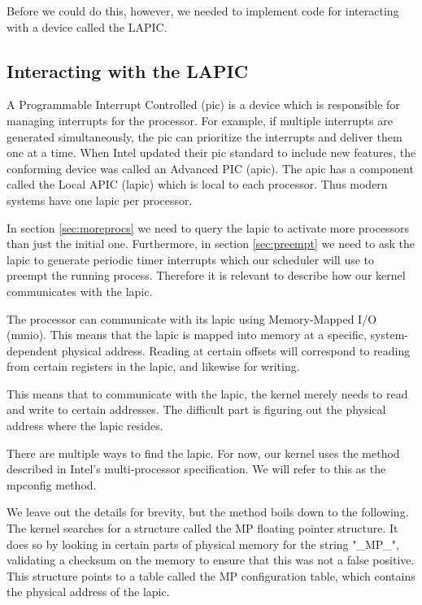 \documentclass{article}
\begin{document}
Before we could do this, however, we needed to implement code for interacting
with a device called the LAPIC.


\subsection{Interacting with the LAPIC}
\label{sec:mpconfig}
A Programmable Interrupt Controlled (\gls{pic}) is a device which is
responsible for managing interrupts for the processor. For example, if
multiple interrupts are generated simultaneously, the \gls{pic} can prioritize
the interrupts and deliver them one at a time. When Intel updated their
\gls{pic} standard to include new features, the conforming device was called
an Advanced PIC (\gls{apic}). The \gls{apic} has a component called the Local
APIC (\gls{lapic}) which is local to each processor. Thus modern systems have
one \gls{lapic} per processor.

In section \ref{sec:moreprocs} we need to query the \gls{lapic} to activate
more processors than just the initial one. Furthermore, in section
\ref{sec:preempt} we need to ask the \gls{lapic} to generate periodic timer
interrupts which our scheduler will use to preempt the running process.
Therefore it is relevant to describe how our kernel communicates with the
\gls{lapic}.

The processor can communicate with its \gls{lapic} using Memory-Mapped I/O
(\gls{mmio}). This means that the \gls{lapic} is mapped into memory at a
specific, system-dependent physical address. Reading at certain offsets will
correspond to reading from certain registers in the \gls{lapic}, and likewise
for writing.

This means that to communicate with the \gls{lapic}, the kernel merely needs
to read and write to certain addresses. The difficult part is figuring out the
physical address where the \gls{lapic} resides.

There are multiple ways to find the \gls{lapic}. For now, our kernel uses the
method described in Intel's multi-processor specification. We will refer to
this as the \gls{mpconfig} method.

We leave out the details for brevity, but the method boils down to the
following. The kernel searches for a structure called the MP floating pointer
structure. It does so by looking in certain parts of physical memory for the
string "\_MP\_", validating a checksum on the memory to ensure that this was
not a false positive. This structure points to a table called the MP
configuration table, which contains the physical address of the \gls{lapic}. 
\end{document}
